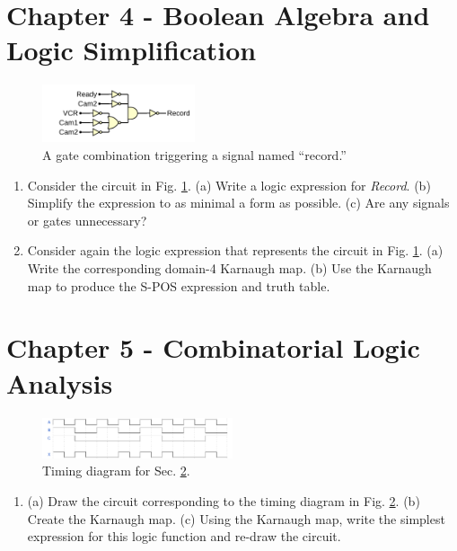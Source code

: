\documentclass[10pt]{article}
\begin{document}
\section{Chapter 4 - Boolean Algebra and Logic Simplification}
\begin{figure}[ht]
\centering
\includegraphics[width=0.4\textwidth]{gateExample4.pdf}
\caption{\label{fig:gates2} A gate combination triggering a signal named ``record.''}
\end{figure}
\begin{enumerate}
\item Consider the circuit in Fig. \ref{fig:gates2}.  (a) Write a logic expression for \textit{Record}. (b) Simplify the expression to as minimal a form as possible. (c) Are any signals or gates unnecessary? \\ \vspace{3cm}
\item Consider again the logic expression that represents the circuit in Fig. \ref{fig:gates2}. (a) Write the corresponding domain-4 Karnaugh map.  (b) Use the Karnaugh map to produce the S-POS expression and truth table. \\ \vspace{3cm}
\end{enumerate}

\section{Chapter 5 - Combinatorial Logic Analysis}
\label{sec:comb}
\begin{figure}[ht]
\centering
\includegraphics[width=0.5\textwidth]{timingExample3.pdf}
\caption{\label{fig:timing3} Timing diagram for Sec. \ref{sec:comb}.}
\end{figure}
\begin{enumerate}
\item (a) Draw the circuit corresponding to the timing diagram in Fig. \ref{fig:timing3}.  (b) Create the Karnaugh map.  (c) Using the Karnaugh map, write the simplest expression for this logic function and re-draw the circuit.
\end{enumerate}
\end{document}
